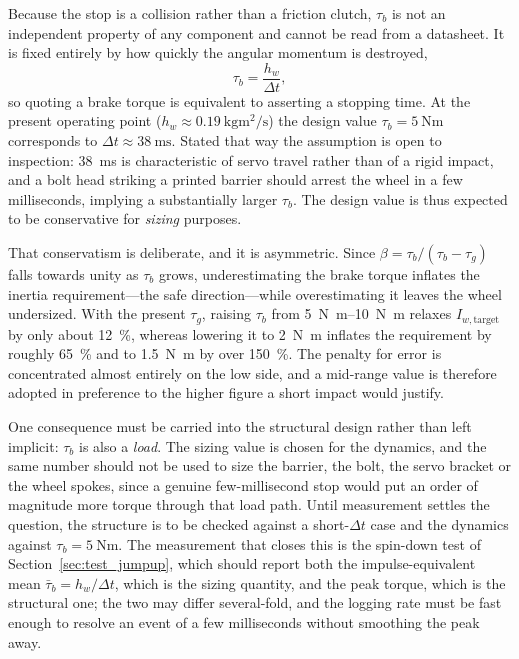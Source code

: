 Because the stop is a collision rather than a friction clutch, $\tau_b$ is not
an independent property of any component and cannot be read from a datasheet.
It is fixed entirely by how quickly the angular momentum is destroyed,
\begin{equation}
\tau_b = \frac{h_w}{\Delta t},
\label{eq:tau_b_from_dt}
\end{equation}
so quoting a brake torque is equivalent to asserting a stopping time. At the
present operating point ($h_w \approx \qty{0.19}{\kilo\gram\metre\squared\per
\second}$) the design value $\tau_b = \qty{5}{\newton\metre}$ corresponds to
$\Delta t \approx \qty{38}{\milli\second}$. Stated that way the assumption is
open to inspection: \qty{38}{\milli\second} is characteristic of servo travel
rather than of a rigid impact, and a bolt head striking a printed barrier
should arrest the wheel in a few milliseconds, implying a substantially larger
$\tau_b$. The design value is thus expected to be conservative for
\emph{sizing} purposes.

That conservatism is deliberate, and it is asymmetric. Since
$\beta = \tau_b/(\tau_b-\tau_g)$ falls towards unity as $\tau_b$ grows,
underestimating the brake torque inflates the inertia requirement---the safe
direction---while overestimating it leaves the wheel undersized. With the
present $\tau_g$, raising $\tau_b$ from \qtyrange{5}{10}{\newton\metre} relaxes
$I_{w,\text{target}}$ by only about \qty{12}{\percent}, whereas lowering it to
\qty{2}{\newton\metre} inflates the requirement by roughly \qty{65}{\percent}
and to \qty{1.5}{\newton\metre} by over \qty{150}{\percent}. The penalty for
error is concentrated almost entirely on the low side, and a mid-range value is
therefore adopted in preference to the higher figure a short impact would
justify.

One consequence must be carried into the structural design rather than left
implicit: $\tau_b$ is also a \emph{load}. The sizing value is chosen for the
dynamics, and the same number should not be used to size the barrier, the bolt,
the servo bracket or the wheel spokes, since a genuine few-millisecond stop
would put an order of magnitude more torque through that load path. Until
measurement settles the question, the structure is to be checked against a
short-$\Delta t$ case and the dynamics against
$\tau_b = \qty{5}{\newton\metre}$. The measurement that closes this is the
spin-down test of Section~\ref{sec:test_jumpup}, which should report both the
impulse-equivalent mean $\bar\tau_b = h_w/\Delta t$, which is the sizing
quantity, and the peak torque, which is the structural one; the two may differ
several-fold, and the logging rate must be fast enough to resolve an event of a
few milliseconds without smoothing the peak away.

